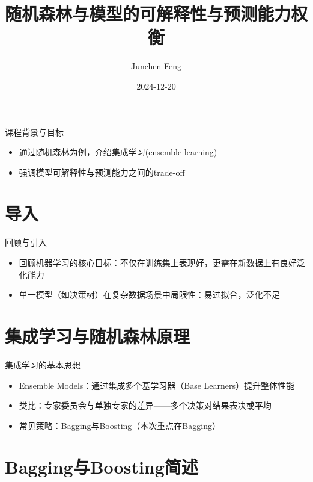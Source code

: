 \documentclass{beamer}
\title{随机森林与模型的可解释性与预测能力权衡}
\author{Junchen Feng}
\date{2024-12-20}
\begin{document}
\maketitle

\begin{frame}{课程背景与目标}
  \begin{itemize}
    \item 通过随机森林为例，介绍集成学习(ensemble learning)
    \item 强调模型可解释性与预测能力之间的trade-off
  \end{itemize}
\end{frame}

\section{导入}
\begin{frame}{回顾与引入}
  \begin{itemize}[<+->]
    \item 回顾机器学习的核心目标：不仅在训练集上表现好，更需在新数据上有良好泛化能力
    \item 单一模型（如决策树）在复杂数据场景中局限性：易过拟合，泛化不足
  \end{itemize}
\end{frame}

\section{集成学习与随机森林原理}
\begin{frame}{集成学习的基本思想}
  \begin{itemize}[<+->]
    \item Ensemble Models：通过集成多个基学习器（Base Learners）提升整体性能
    \item 类比：专家委员会与单独专家的差异——多个决策对结果表决或平均
    \item 常见策略：Bagging与Boosting（本次重点在Bagging）
  \end{itemize}
\end{frame}

\section{Bagging与Boosting简述}
\end{document}
